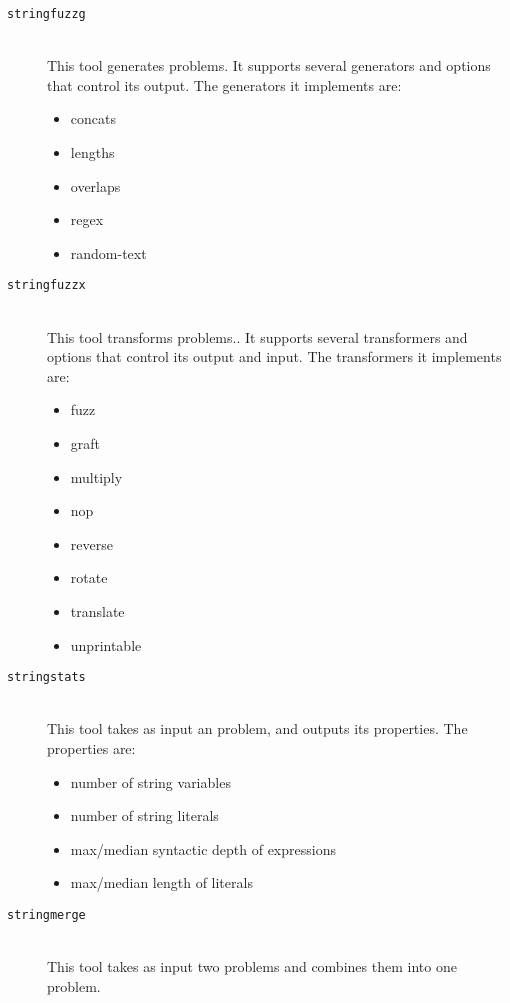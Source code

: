     \begin{description}

        \item[\texttt{stringfuzzg}] \hfill \\
            This tool generates \smt{} problems. It supports several generators and options that control its output. The generators it implements are:

            \begin{itemize}
                \item concats
                \item lengths
                \item overlaps
                \item regex
                \item random-text
            \end{itemize}

        \item[\texttt{stringfuzzx}] \hfill \\
            This tool transforms \smt{} problems.. It supports several transformers and options that control its output and input. The transformers it implements are:

            \begin{itemize}
                \item fuzz
                \item graft
                \item multiply
                \item nop
                \item reverse
                \item rotate
                \item translate
                \item unprintable
            \end{itemize}

        \item[\texttt{stringstats}] \hfill \\
            This tool takes as input an \smt{} problem, and outputs its properties. The properties are:

            \begin{itemize}
                \item number of string variables
                \item number of string literals
                \item max/median syntactic depth of expressions
                \item max/median length of literals
            \end{itemize}

            \hfill

        \item[\texttt{stringmerge}] \hfill \\
            This tool takes as input two \smt{} problems and combines them into one problem.

    \end{description}

